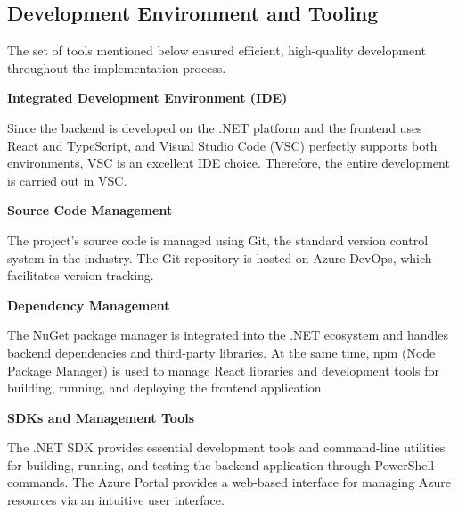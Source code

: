 \subsection{Development Environment and Tooling}

The set of tools mentioned below ensured efficient, high-quality development throughout the implementation process.

\textbf{Integrated Development Environment (IDE)}

Since the backend is developed on the .NET platform and the frontend uses React and TypeScript, and Visual Studio Code (VSC) perfectly supports both environments, VSC is an excellent IDE choice. Therefore, the entire development is carried out in VSC.

\textbf{Source Code Management}

The project's source code is managed using Git, the standard version control system in the industry. The Git repository is hosted on Azure DevOps, which facilitates version tracking.

\textbf{Dependency Management}

The NuGet package manager is integrated into the .NET ecosystem and handles backend dependencies and third-party libraries. At the same time, npm (Node Package Manager) is used to manage React libraries and development tools for building, running, and deploying the frontend application. 

\textbf{SDKs and Management Tools}

The .NET SDK provides essential development tools and command-line utilities for building, running, and testing the backend application through PowerShell commands. The Azure Portal provides a web-based interface for managing Azure resources via an intuitive user interface.
